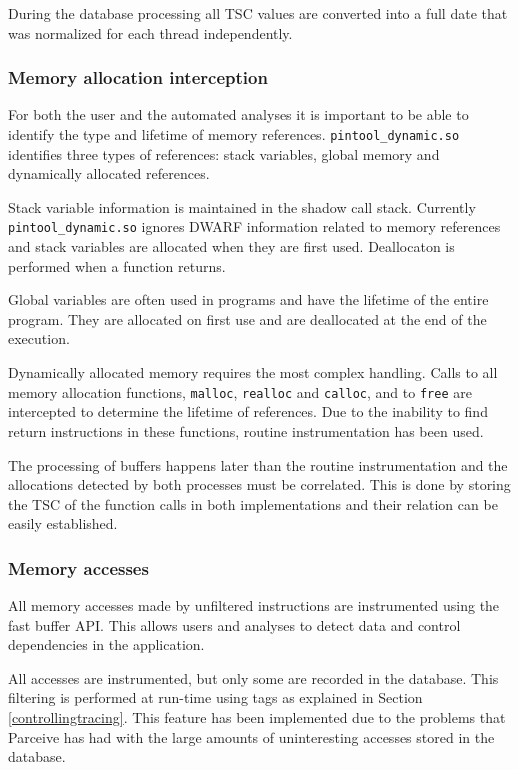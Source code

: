 During the database processing all TSC values are converted into a full date that was normalized for each thread independently.

\subsubsection{Memory allocation interception}

For both the user and the automated analyses it is important to be able to identify the type and lifetime of memory references. \texttt{pintool\_dynamic.so} identifies three types of references: stack variables, global memory and dynamically allocated references.

Stack variable information is maintained in the shadow call stack. Currently \texttt{pintool\_dynamic.so} ignores DWARF information related to memory references and stack variables are allocated when they are first used. Deallocaton is performed when a function returns.

Global variables are often used in programs and have the lifetime of the entire program. They are allocated on first use and are deallocated at the end of the execution.

Dynamically allocated memory requires the most complex handling. Calls to all memory allocation functions, \texttt{malloc}, \texttt{realloc} and \texttt{calloc}, and to \texttt{free} are intercepted to determine the lifetime of references. Due to the inability to find return instructions in these functions, routine instrumentation has been used.

The processing of buffers happens later than the routine instrumentation and the allocations detected by both processes must be correlated. This is done by storing the TSC of the function calls in both implementations and their relation can be easily established.

\subsubsection{Memory accesses}

All memory accesses made by unfiltered instructions are instrumented using the fast buffer API. This allows users and analyses to detect data and control dependencies in the application.

All accesses are instrumented, but only some are recorded in the database. This filtering is performed at run-time using tags as explained in Section \ref{controllingtracing}. This feature has been implemented due to the problems that Parceive \cite{parceive} has had with the large amounts of uninteresting accesses stored in the database.

